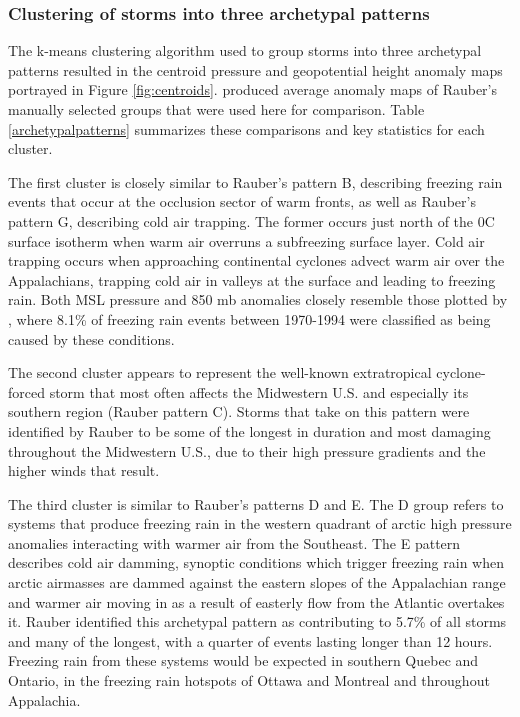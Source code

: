 \documentclass[twocol]{ametsoc}
\begin{document}
\subsubsection{Clustering of storms into three archetypal patterns}
The k-means clustering algorithm used to group storms into three archetypal patterns resulted in the centroid pressure and geopotential height anomaly maps portrayed in Figure \ref{fig:centroids}. \citet{erfani2012automated} produced average anomaly maps of Rauber's manually selected groups that were used here for comparison. Table \ref{archetypalpatterns} summarizes these comparisons and key statistics for each cluster.

The first cluster is closely similar to Rauber's pattern B, describing freezing rain events that occur at the occlusion sector of warm fronts, as well as Rauber's pattern G, describing cold air trapping. The former occurs just north of the 0\degree C surface isotherm when warm air overruns a subfreezing surface layer. Cold air trapping occurs when approaching continental cyclones advect warm air over the Appalachians, trapping cold air in valleys at the surface and leading to freezing rain. Both MSL pressure and 850 mb anomalies closely resemble those plotted by \citet{rauber2001synoptic}, where  8.1\% of freezing rain events between 1970-1994 were classified as being caused by these conditions. 

The second cluster appears to represent the well-known extratropical cyclone-forced storm that most often affects the Midwestern U.S. and especially its southern region (Rauber pattern C). Storms that take on this pattern were identified by Rauber to be some of the longest in duration and most damaging throughout the Midwestern U.S., due to their high pressure gradients and the higher winds that result. 

The third cluster is similar to Rauber's patterns D and E. The D group refers to systems that produce freezing rain in the western quadrant of arctic high pressure anomalies interacting with warmer air from the Southeast. The E pattern describes cold air damming, synoptic conditions which trigger freezing rain when arctic airmasses are dammed against the eastern slopes of the Appalachian range and warmer air moving in as a result of easterly flow from the Atlantic overtakes it. Rauber identified this archetypal pattern as contributing to 5.7\% of all storms and many of the longest, with a quarter of events lasting longer than 12 hours. Freezing rain from these systems would be expected in southern Quebec and Ontario, in the freezing rain hotspots of Ottawa and Montreal and throughout Appalachia. 
\end{document}
